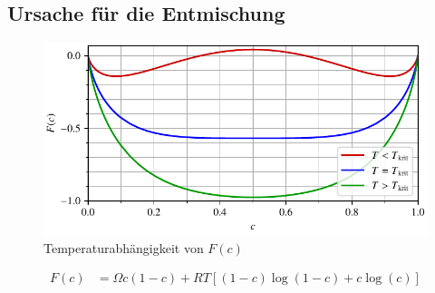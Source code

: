 \subsection{Ursache für die Entmischung}

\begin{figure}
\centering
\includegraphics[scale=0.8]{papers/cahnhilliard/presentation/images/energy.book.pdf}
\caption{Temperaturabhängigkeit von $F(c)$}
\label{cahnhilliard:fig:fc}
\end{figure}

\begin{align*}
F(c)
&=
\Omega c (1 - c) + R T \left[ (1-c) \log(1-c) + c \log(c) \right]
\end{align*}

